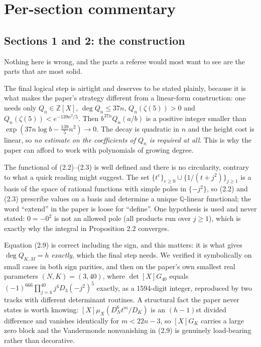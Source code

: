 \documentclass[11pt]{article}
\theoremstyle{definition}
\newcommand{\z}{\zeta(5)}
\begin{document}
\section{Per-section commentary}

\subsection{Sections 1 and 2: the construction}

Nothing here is wrong, and the parts a referee would most want to see are the parts that are
most solid.

The final logical step is airtight and deserves to be stated plainly, because it is what makes
the paper's strategy different from a linear-form construction: one needs only
$Q_n\in\mathbb{Z}[X]$, $\deg Q_n\le37n$, $Q_n(\z)>0$ and $Q_n(\z)<e^{-139n^2/5}$. Then
$b^{37n}Q_n(a/b)$ is a positive integer smaller than $\exp(37n\log b-\tfrac{139}{5}n^2)\to0$.
The decay is quadratic in $n$ and the height cost is linear, so \emph{no estimate on the
coefficients of $Q_n$ is required at all}. This is why the paper can afford to work with
polynomials of growing degree.

The functional of (2.2)--(2.3) is well defined and there is no circularity, contrary to what a
quick reading might suggest. The set $\{t^e\}_{e\ge0}\cup\{1/(t+j^2)\}_{j\ge1}$ is a basis of
the space of rational functions with simple poles in $\{-j^2\}$, so (2.2) and (2.3) prescribe
values on a basis and determine a unique $\mathbb{Q}$-linear functional; the word ``extend'' in
the paper is loose for ``define''. One hypothesis is used and never stated: $0=-0^2$ is not an
allowed pole (all products run over $j\ge1$), which is exactly why the integral in
Proposition 2.2 converges.

Equation (2.9) is correct including the sign, and this matters: it is what gives
$\deg Q_{K,M}=h$ \emph{exactly}, which the final step needs. We verified it symbolically on
small cases in both sign parities, and then on the paper's own smallest real parameters
$(N,K)=(3,40)$, where $\det[X]G_{40}$ equals
$(-1)^{666}\prod_{j=4}^{40}j^4D_3(-j^2)^5$ exactly, as a 1594-digit integer, reproduced by two
tracks with different determinant routines. A structural fact the paper never states is worth
knowing: $[X]\mu_X(D_N^6t^m/D_K)$ is an $(h{-}1)$st divided difference and vanishes identically
for $m<22n-3$, so $[X]G_K$ carries a large zero block and the Vandermonde nonvanishing in (2.9)
is genuinely load-bearing rather than decorative.
\end{document}
